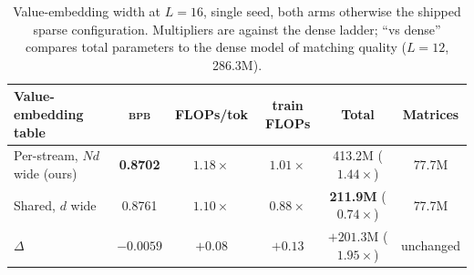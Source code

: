 \documentclass{article}
\newcommand{\bpb}{\textsc{bpb}}
\newcommand{\dsub}{d}
\newcommand{\nsub}{N}
\begin{document}
\begin{table}[t]
\caption{Value-embedding width at $L{=}16$, single seed, both arms otherwise the
shipped sparse configuration. Multipliers are against the dense ladder; ``vs
dense'' compares total parameters to the dense model of matching quality
($L{=}12$, 286.3M).}
\label{tab:veplain}
\begin{center}
\begin{small}
\setlength{\tabcolsep}{4pt}
\begin{tabular}{lccccc}
\toprule
Value-embedding table & \bpb & FLOPs/tok & train FLOPs & Total & Matrices \\
\midrule
Per-stream, $\nsub\dsub$ wide (ours) & \textbf{0.8702} & $\mathbf{1.18\times}$ & $\mathbf{1.01\times}$ & 413.2M ($1.44\times$) & 77.7M \\
Shared, $\dsub$ wide                 & 0.8761 & $1.10\times$ & $0.88\times$ & \textbf{211.9M} ($\mathbf{0.74\times}$) & 77.7M \\
\midrule
$\Delta$ & $-0.0059$ & $+0.08$ & $+0.13$ & $+201.3$M ($1.95\times$) & unchanged \\
\bottomrule
\end{tabular}
\end{small}
\end{center}
\end{table}
\end{document}
